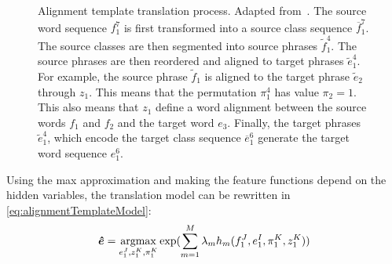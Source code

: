 \begin{figure}
\begin{center}
  \end{center}
  \caption{Alignment template translation process.
    Adapted from~\citep{och-ney:2004:CL}. The source word
  sequence $f_1^7$ is first transformed into a source class
  sequence $\overline{f}_1^7$. The source classes are then segmented
  into source phrases $\widetilde{f}_1^4$. The source phrases are then
  reordered and aligned to target phrases $\widetilde{e}_1^4$.
  For example, the source phrase $\widetilde{f}_1$ is aligned to
  the target phrase $\widetilde{e}_2$ through $z_1$.
  This means that the permutation $\pi_1^4$
  has value $\pi_2 = 1$. This also means that $z_1$
  define a word alignment between the source words $f_1$ and $f_2$
  and the target word $e_3$. Finally, the target
  phrases $\widetilde{e}_1^4$, which encode the target class sequence
  $\overline{e}_1^6$ generate the target word sequence $e_1^6$.}
  \label{fig:alignmentTemplateTranslationModel}
\end{figure}

Using the max approximation and making the feature
functions depend on the hidden variables, the translation model
can be rewritten in \autoref{eq:alignmentTemplateModel}:
%
\begin{equation}
  \bm{\hat{e}} = \operatorname*{argmax}_{e_1^J, z_1^K, \pi_1^K} \exp(\sum_{m = 1}^M \lambda_m h_m(f_1^J, e_1^I, \pi_1^K, z_1^K))
  \label{eq:alignmentTemplateModel}
\end{equation}
%


